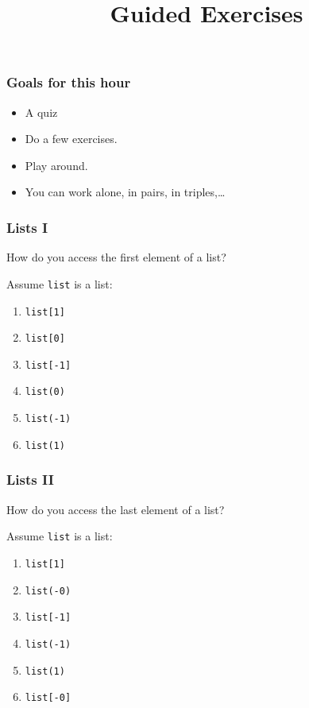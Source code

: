 
\title{Guided Exercises}

\frame{\maketitle}

\begin{frame}
\frametitle{Goals for this hour}

\begin{itemize}
\item A quiz
\item Do a few exercises.
\item Play around.
\item You can work alone, in pairs, in triples,\ldots
\end{itemize}

\end{frame}

\begin{frame}
\frametitle{Lists I}

How do you access the first element of a list?

Assume \texttt{list} is a list:

\begin{enumerate}
\item \texttt{list[1]}
\item \texttt{list[0]}
\item \texttt{list[-1]}
\item \texttt{list(0)}
\item \texttt{list(-1)}
\item \texttt{list(1)}
\end{enumerate}
\end{frame}

\begin{frame}
\frametitle{Lists II}

How do you access the last element of a list?

Assume \texttt{list} is a list:

\begin{enumerate}
\item \texttt{list[1]}
\item \texttt{list(-0)}
\item \texttt{list[-1]}
\item \texttt{list(-1)}
\item \texttt{list(1)}
\item \texttt{list[-0]}
\end{enumerate}
\end{frame}


